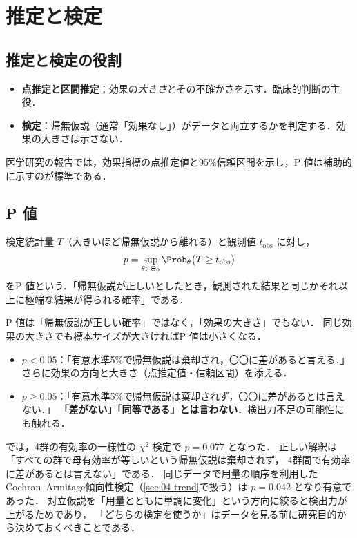 \section{推定と検定}\label{sec:01-inference}
\subsection{推定と検定の役割}
\begin{itemize}
\item \textbf{点推定と区間推定}：効果の\emph{大きさ}とその不確かさを示す．臨床的判断の主役．
\item \textbf{検定}：帰無仮説（通常「効果なし」）がデータと両立するかを判定する．効果の大きさは示さない．
\end{itemize}
医学研究の報告では，効果指標の点推定値と95\%信頼区間を示し，P 値は補助的に示すのが標準である．

\subsection{P 値}\label{subsec:01-pvalue}
\begin{teigi}[P 値]\label{def:01-pvalue}
検定統計量 $T$（大きいほど帰無仮説から離れる）と観測値 $t_{\mathrm{obs}}$ に対し，
\[
p=\sup_{\theta\in\Theta_0}\Prob_\theta\bigl(T\ge t_{\mathrm{obs}}\bigr)
\]
をP 値という．「帰無仮説が正しいとしたとき，観測された結果と同じかそれ以上に極端な結果が得られる確率」である．
\end{teigi}
\Youchui P 値は「帰無仮説が正しい確率」ではなく，「効果の大きさ」でもない．
同じ効果の大きさでも標本サイズが大きければP 値は小さくなる．

\begin{pointbox}
\begin{itemize}
\item $p<0.05$：「有意水準5\%で帰無仮説は棄却され，〇〇に差があると言える．」
      さらに効果の方向と大きさ（点推定値・信頼区間）を添える．
\item $p\ge 0.05$：「有意水準5\%で帰無仮説は棄却されず，〇〇に差があるとは言えない．」
      \textbf{「差がない」「同等である」とは言わない}．検出力不足の可能性にも触れる．
\end{itemize}
\end{pointbox}

 では，4群の有効率の一様性の $\chi^2$ 検定で $p=0.077$ となった．
正しい解釈は「すべての群で母有効率が等しいという帰無仮説は棄却されず，
4群間で有効率に差があるとは言えない」である．
同じデータで用量の順序を利用したCochran--Armitage傾向性検定（\cref{sec:04-trend}で扱う）は $p=0.042$ となり有意であった．
対立仮説を「用量とともに単調に変化」という方向に絞ると検出力が上がるためであり，
「どちらの検定を使うか」はデータを見る前に研究目的から決めておくべきことである．

